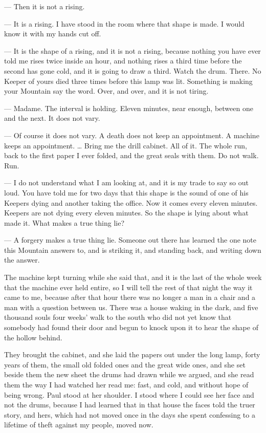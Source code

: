 
\begin{room}

--- Then it is not a rising.

--- It is a rising. I have stood in the room where that shape is made. I would know it with my hands cut off.

--- It is the shape of a rising, and it is not a rising, because nothing you have ever told me rises twice inside an hour, and nothing rises a third time before the second has gone cold, and it is going to draw a third. Watch the drum. There. No Keeper of yours died three times before this lamp was lit. Something is making your Mountain say the word. Over, and over, and it is not tiring.

--- Madame. The interval is holding. Eleven minutes, near enough, between one and the next. It does not vary.

--- Of course it does not vary. A death does not keep an appointment. A machine keeps an appointment. \ldots{} Bring me the drill cabinet. All of it. The whole run, back to the first paper I ever folded, and the great seals with them. Do not walk. Run.

--- I do not understand what I am looking at, and it is my trade to say so out loud. You have told me for two days that this shape is the sound of one of his Keepers dying and another taking the office. Now it comes every eleven minutes. Keepers are not dying every eleven minutes. So the shape is lying about what made it. What makes a true thing lie?

--- A forgery makes a true thing lie. Someone out there has learned the one note this Mountain answers to, and is striking it, and standing back, and writing down the answer.

\end{room}

The machine kept turning while she said that, and it is the last of the whole week that the machine ever held entire, so I will tell the rest of that night the way it came to me, because after that hour there was no longer a man in a chair and a man with a question between us. There was a house waking in the dark, and five thousand souls four weeks' walk to the south who did not yet know that somebody had found their door and begun to knock upon it to hear the shape of the hollow behind.\par

They brought the cabinet, and she laid the papers out under the long lamp, forty years of them, the small old folded ones and the great wide ones, and she set beside them the new sheet the drums had drawn while we argued, and she read them the way I had watched her read me: fast, and cold, and without hope of being wrong. Paul stood at her shoulder. I stood where I could see her face and not the drums, because I had learned that in that house the faces told the truer story, and hers, which had not moved once in the days she spent confessing to a lifetime of theft against my people, moved now.\par

